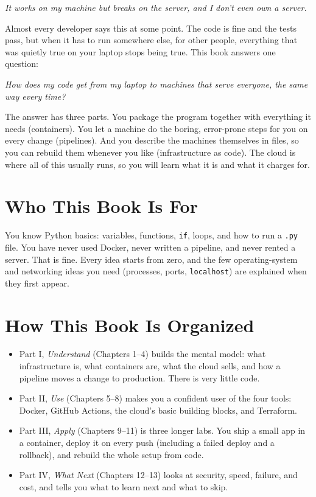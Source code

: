 
\begin{chapterintro}

\emph{It works on my machine but breaks on the server, and I don't even own a server.}

\end{chapterintro}

Almost every developer says this at some point. The code is fine and the tests pass, but when it has to run somewhere else, for other people, everything that was quietly true on your laptop stops being true. This book answers one question:

\emph{How does my code get from my laptop to machines that serve everyone, the same way every time?}

The answer has three parts. You package the program together with everything it needs (containers). You let a machine do the boring, error-prone steps for you on every change (pipelines). And you describe the machines themselves in files, so you can rebuild them whenever you like (infrastructure as code). The cloud is where all of this usually runs, so you will learn what it is and what it charges for.

\section{Who This Book Is For}\label{00-preface:who-this-book-is-for}

You know Python basics: variables, functions, \texttt{if}, loops, and how to run a \texttt{.py} file. You have never used Docker, never written a pipeline, and never rented a server. That is fine. Every idea starts from zero, and the few operating-system and networking ideas you need (processes, ports, \texttt{localhost}) are explained when they first appear.

\section{How This Book Is Organized}\label{00-preface:how-this-book-is-organized}

\begin{itemize}
\tightlist
\item
  Part I, \emph{Understand} (Chapters 1--4) builds the mental model: what infrastructure is, what containers are, what the cloud sells, and how a pipeline moves a change to production. There is very little code.
\item
  Part II, \emph{Use} (Chapters 5--8) makes you a confident user of the four tools: Docker, GitHub Actions, the cloud's basic building blocks, and Terraform.
\item
  Part III, \emph{Apply} (Chapters 9--11) is three longer labs. You ship a small app in a container, deploy it on every push (including a failed deploy and a rollback), and rebuild the whole setup from code.
\item
  Part IV, \emph{What Next} (Chapters 12--13) looks at security, speed, failure, and cost, and tells you what to learn next and what to skip.
\end{itemize}

